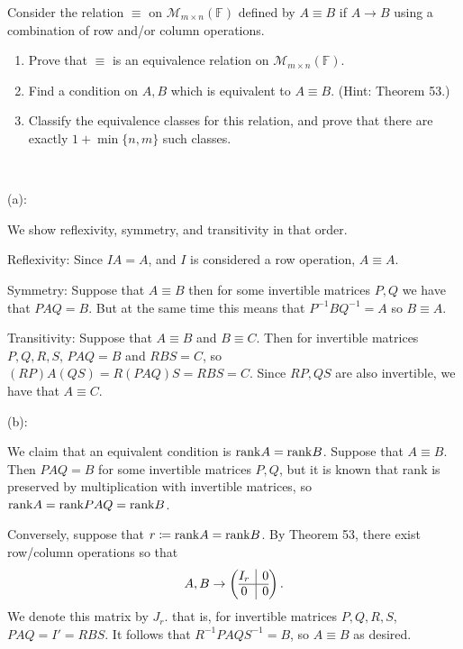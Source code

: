 \documentclass{eh-homework}
\begin{document}
    \begin{question}{9}
        Consider the relation \( \equiv \) on \( \mathcal{M}_{m \times n}(\mathbb{F}) \) defined by \( A \equiv B \) if \( A \to B \) using a combination of row and/or column operations.

        \begin{enumerate}[label=(\alph*)]
            \item Prove that \( \equiv \) is an equivalence relation on \( \mathcal{M}_{m \times n}(\mathbb{F}) \).
            \item Find a condition on \( A, B \) which is equivalent to \( A \equiv B \). (Hint: Theorem 53.)
            \item Classify the equivalence classes for this relation, and prove that there are exactly \( 1 + \min\{n, m\} \) such classes.
        \end{enumerate}
        \tcblower
        \ 

        (a):

        We show reflexivity, symmetry, and transitivity in that order.

        Reflexivity: Since \(IA = A\), and \(I\) is considered a row operation, \(A \equiv A\).

        Symmetry: Suppose that \(A \equiv B\) then for some invertible matrices \(P,Q\) we have that \(PAQ = B\). But at the same time this means that \(P^{-1} B Q^{-1} = A\) so \(B \equiv A\).

        Transitivity: Suppose that \(A \equiv B\) and \(B \equiv C\). Then for invertible matrices \(P,Q,R,S\), \(PAQ = B\) and \(RBS = C\), so \((RP)A(QS) = R(PAQ)S = RBS = C\). Since \(RP, QS\) are also invertible, we have that \(A \equiv C\).

        \medskip

        (b):

        We claim that an equivalent condition is \(\mathrm{rank} A = \mathrm{rank} B\). Suppose that \(A \equiv B\). Then \(PAQ = B\) for some invertible matrices \(P,Q\), but it is known that rank is preserved by multiplication with invertible matrices, so \(\mathrm{rank} A = \mathrm{rank} PAQ = \mathrm{rank} B\).

        Conversely, suppose that \(r \coloneqq \mathrm{rank} A = \mathrm{rank} B\). By Theorem 53, there exist row/column operations so that
        \[
            A,B \to \left( \begin{array}{@{}c|c@{}}
                I_r & 0 \\
                \hline
                0 & 0
            \end{array} \right).
        \]
        We denote this matrix by \(J_r\).
        that is, for invertible matrices \(P,Q,R,S\), \(PAQ = I' = RBS\). It follows that \(R^{-1} P A Q S^{-1} = B\), so \(A \equiv B\) as desired.


\end{question}
\end{document}
